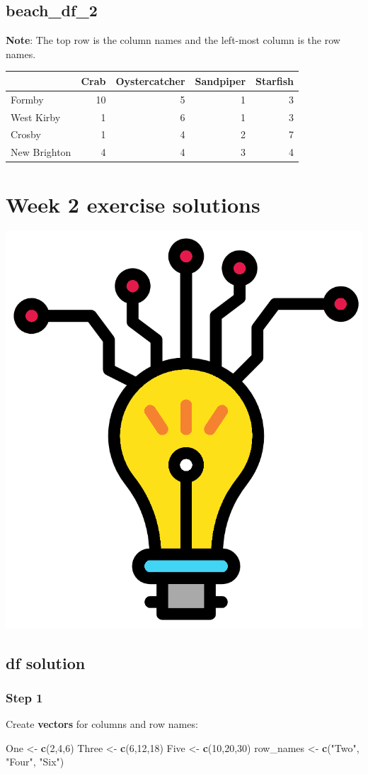 \documentclass[]{book}
\newenvironment{Shaded}{\begin{snugshade}}{\end{snugshade}}
\newcommand{\KeywordTok}[1]{\textcolor[rgb]{0.13,0.29,0.53}{\textbf{#1}}}
\newcommand{\DecValTok}[1]{\textcolor[rgb]{0.00,0.00,0.81}{#1}}
\newcommand{\StringTok}[1]{\textcolor[rgb]{0.31,0.60,0.02}{#1}}
\newcommand{\NormalTok}[1]{#1}
\begin{document}
\section{beach\_df\_2}\label{beach_df_2}

\textbf{Note}: The top row is the column names and the left-most column
is the row names.

\begin{tabular}{l|r|r|r|r}
\hline
  & Crab & Oystercatcher & Sandpiper & Starfish\\
\hline
Formby & 10 & 5 & 1 & 3\\
\hline
West Kirby & 1 & 6 & 1 & 3\\
\hline
Crosby & 1 & 4 & 2 & 7\\
\hline
New Brighton & 4 & 4 & 3 & 4\\
\hline
\end{tabular}

\chapter{Week 2 exercise solutions}\label{week-2-exercise-solutions}

\begin{center}\includegraphics[width=0.2\linewidth]{figures/week2_solutions} \end{center}

\section{df solution}\label{df-solution}

\subsection{Step 1}\label{step-1}

Create \textbf{vectors} for columns and row names:

\begin{Shaded}
\begin{Highlighting}[]
\NormalTok{One <-}\StringTok{ }\KeywordTok{c}\NormalTok{(}\DecValTok{2}\NormalTok{,}\DecValTok{4}\NormalTok{,}\DecValTok{6}\NormalTok{)}
\NormalTok{Three <-}\StringTok{ }\KeywordTok{c}\NormalTok{(}\DecValTok{6}\NormalTok{,}\DecValTok{12}\NormalTok{,}\DecValTok{18}\NormalTok{)}
\NormalTok{Five <-}\StringTok{ }\KeywordTok{c}\NormalTok{(}\DecValTok{10}\NormalTok{,}\DecValTok{20}\NormalTok{,}\DecValTok{30}\NormalTok{)}
\NormalTok{row_names <-}\StringTok{ }\KeywordTok{c}\NormalTok{(}\StringTok{"Two"}\NormalTok{, }\StringTok{"Four"}\NormalTok{, }\StringTok{"Six"}\NormalTok{)}
\end{Highlighting}
\end{Shaded}
\end{document}
